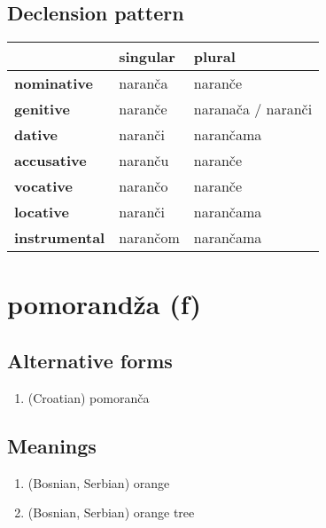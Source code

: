 \subsection*{Declension pattern}
\begin{tabularx}{\linewidth}{Xll}
\toprule
{} &  singular &              plural \\
\midrule
\textbf{nominative  } &   naranča &             naranče \\
\textbf{genitive    } &   naranče &  naranača / naranči \\
\textbf{dative      } &   naranči &           narančama \\
\textbf{accusative  } &   naranču &             naranče \\
\textbf{vocative    } &   narančo &             naranče \\
\textbf{locative    } &   naranči &           narančama \\
\textbf{instrumental} &  narančom &           narančama \\
\bottomrule
\end{tabularx}

\filbreak
\section{pomorandža (f)}
\subsection*{Alternative forms}
\begin{enumerate}
\item (Croatian) pomoranča
\end{enumerate}
\subsection*{Meanings}
\begin{enumerate}
\item (Bosnian, Serbian) orange
\item (Bosnian, Serbian) orange tree
\end{enumerate}
